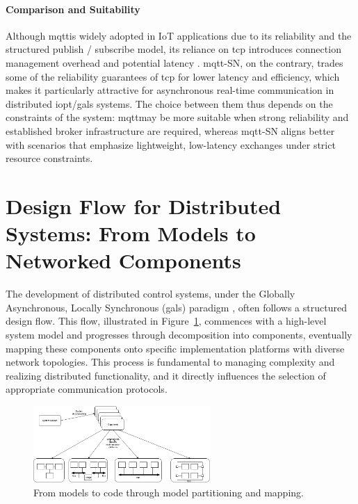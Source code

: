 \paragraph{Comparison and Suitability}
Although \gls{mqtt}is widely adopted in IoT applications due to its reliability and the structured publish / subscribe model, its reliance on \gls{tcp} introduces connection management overhead and potential latency \cite{banks2014mqtt}. \gls{mqtt}-SN, on the contrary, trades some of the reliability guarantees of \gls{tcp} for lower latency and efficiency, which makes it particularly attractive for asynchronous real-time communication in distributed \gls{iopt}/\gls{gals} systems. The choice between them thus depends on the constraints of the system: \gls{mqtt}may be more suitable when strong reliability and established broker infrastructure are required, whereas \gls{mqtt}-SN aligns better with scenarios that emphasize lightweight, low-latency exchanges under strict resource constraints.



 

\section{Design Flow for Distributed Systems: From Models to Networked Components }
\label{sec:design_flow}

The development of distributed control systems, under the Globally Asynchronous, Locally Synchronous (\gls{gals}) paradigm \cite{galsactd, galsborman}, often follows a structured design flow. This flow, illustrated in Figure~\ref{fig:model_to_code_mapping}, commences with a high-level system model and progresses through decomposition into components, eventually mapping these components onto specific implementation platforms with diverse network topologies. This process is fundamental to managing complexity and realizing distributed functionality, and it directly influences the selection of appropriate communication protocols.


\begin{figure}[htbp]
  \centering
 \includegraphics[width=0.6\textwidth]{Chapters/Figures/model_to_code_mapping.png}
  \caption{From models to code through model partitioning and mapping.}
  \label{fig:model_to_code_mapping}
\end{figure}


